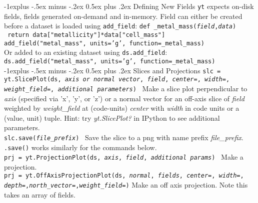 \documentclass[10pt,landscape]{article}
\makeatletter
\renewcommand{\subsection}{\@startsection{subsection}{2}{0mm}%
                                {-1explus -.5ex minus -.2ex}%
                                {0.5ex plus .2ex}%
                                {\normalfont\normalsize\bfseries}}
\makeatother
\begin{document}
\begin{multicols}{3}
\subsection{Defining New Fields}
\texttt{yt} expects on-disk fields, fields generated on-demand and in-memory.
Field can either be created before a dataset is loaded using \texttt{add\_field}:
\texttt{def \_metal\_mass(\textit{field},\textit{data})}\\
\texttt{\hspace{4 mm} return data["metallicity"]*data["cell\_mass"]}\\
\texttt{add\_field("metal\_mass", units='g', function=\_metal\_mass)}\\
Or added to an existing dataset using \texttt{ds.add\_field}:
\texttt{ds.add\_field("metal\_mass", units='g', function=\_metal\_mass)}\\

\subsection{Slices and Projections}
\texttt{slc = yt.SlicePlot(ds, \textit{axis or normal vector}, \textit{field}, \textit{center=}, \textit{width=}, \textit{weight\_field=}, \textit{additional parameters})} \textemdash\ Make a slice plot
perpendicular to \textit{axis} (specified via 'x', 'y', or 'z') or a normal vector for an off-axis slice of \textit{field} weighted by \textit{weight\_field} at (code-units) \textit{center} with
\textit{width} in code units or a (value, unit) tuple. Hint: try \textit{yt.SlicePlot?} in IPython to see additional parameters.\\
\texttt{slc.save(\textit{file\_prefix})} \textemdash\ Save the slice to a png with name prefix \textit{file\_prefix}.
\texttt{.save()} works similarly for the commands below.\\

\texttt{prj = yt.ProjectionPlot(ds, \textit{axis}, \textit{field}, \textit{additional params})} \textemdash\ Make a projection. \\
\texttt{prj = yt.OffAxisProjectionPlot(ds, \textit{normal}, \textit{fields}, \textit{center=}, \textit{width=}, \textit{depth=},\textit{north\_vector=},\textit{weight\_field=})} \textemdash Make an off axis projection. Note this takes an array of fields. \\


\end{multicols}
\end{document}
